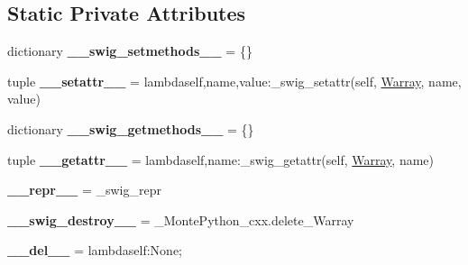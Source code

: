\subsection*{Static Private Attributes}
\begin{DoxyCompactItemize}
\item 
\hypertarget{classMontePython__cxx_1_1Warray_a67fd9943b444f323121c19864e256e85}{}dictionary {\bfseries \+\_\+\+\_\+swig\+\_\+setmethods\+\_\+\+\_\+} = \{\}\label{classMontePython__cxx_1_1Warray_a67fd9943b444f323121c19864e256e85}

\item 
\hypertarget{classMontePython__cxx_1_1Warray_a3775531f5622b6ab859bcc792d5aa8af}{}tuple {\bfseries \+\_\+\+\_\+setattr\+\_\+\+\_\+} = lambdaself,name,value\+:\+\_\+swig\+\_\+setattr(self, \hyperlink{classMontePython__cxx_1_1Warray}{Warray}, name, value)\label{classMontePython__cxx_1_1Warray_a3775531f5622b6ab859bcc792d5aa8af}

\item 
\hypertarget{classMontePython__cxx_1_1Warray_a2ce4b2e1caf2279f5d4b8b0ce648d174}{}dictionary {\bfseries \+\_\+\+\_\+swig\+\_\+getmethods\+\_\+\+\_\+} = \{\}\label{classMontePython__cxx_1_1Warray_a2ce4b2e1caf2279f5d4b8b0ce648d174}

\item 
\hypertarget{classMontePython__cxx_1_1Warray_a4b022be43531d24c897d6b054190d579}{}tuple {\bfseries \+\_\+\+\_\+getattr\+\_\+\+\_\+} = lambdaself,name\+:\+\_\+swig\+\_\+getattr(self, \hyperlink{classMontePython__cxx_1_1Warray}{Warray}, name)\label{classMontePython__cxx_1_1Warray_a4b022be43531d24c897d6b054190d579}

\item 
\hypertarget{classMontePython__cxx_1_1Warray_a790625205e76f805dee006af5f11f949}{}{\bfseries \+\_\+\+\_\+repr\+\_\+\+\_\+} = \+\_\+swig\+\_\+repr\label{classMontePython__cxx_1_1Warray_a790625205e76f805dee006af5f11f949}

\item 
\hypertarget{classMontePython__cxx_1_1Warray_af38824c578a8e8bf040996cf8705f068}{}{\bfseries \+\_\+\+\_\+swig\+\_\+destroy\+\_\+\+\_\+} = \+\_\+\+Monte\+Python\+\_\+cxx.\+delete\+\_\+\+Warray\label{classMontePython__cxx_1_1Warray_af38824c578a8e8bf040996cf8705f068}

\item 
\hypertarget{classMontePython__cxx_1_1Warray_aebf3c7385a1b56f2bfbc76cb52c41660}{}{\bfseries \+\_\+\+\_\+del\+\_\+\+\_\+} = lambdaself\+:\+None;\label{classMontePython__cxx_1_1Warray_aebf3c7385a1b56f2bfbc76cb52c41660}

\end{DoxyCompactItemize}


